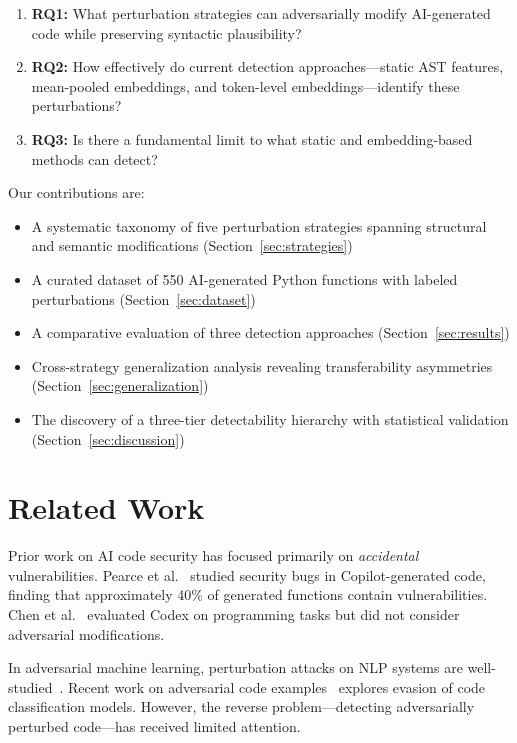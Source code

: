 \documentclass[11pt]{article}
\begin{document}
\begin{enumerate}
    \item \textbf{RQ1:} What perturbation strategies can adversarially modify AI-generated code while preserving syntactic plausibility?
    \item \textbf{RQ2:} How effectively do current detection approaches—static AST features, mean-pooled embeddings, and token-level embeddings—identify these perturbations?
    \item \textbf{RQ3:} Is there a fundamental limit to what static and embedding-based methods can detect?
\end{enumerate}

Our contributions are:
\begin{itemize}
    \item A systematic taxonomy of five perturbation strategies spanning structural and semantic modifications (Section~\ref{sec:strategies})
    \item A curated dataset of 550 AI-generated Python functions with labeled perturbations (Section~\ref{sec:dataset})
    \item A comparative evaluation of three detection approaches (Section~\ref{sec:results})
    \item Cross-strategy generalization analysis revealing transferability asymmetries (Section~\ref{sec:generalization})
    \item The discovery of a three-tier detectability hierarchy with statistical validation (Section~\ref{sec:discussion})
\end{itemize}

\section{Related Work}
\label{sec:related}

Prior work on AI code security has focused primarily on \textit{accidental} vulnerabilities. Pearce et al.~\cite{pearce2022asleep} studied security bugs in Copilot-generated code, finding that approximately 40\% of generated functions contain vulnerabilities. Chen et al.~\cite{chen2021evaluating} evaluated Codex on programming tasks but did not consider adversarial modifications.

In adversarial machine learning, perturbation attacks on NLP systems are well-studied~\cite{jia2017adversarial}. Recent work on adversarial code examples~\cite{yang2022natural} explores evasion of code classification models. However, the reverse problem—detecting adversarially perturbed code—has received limited attention.
\end{document}
